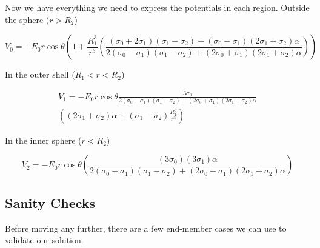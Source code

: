 Now we have everything we need to express the potentials in each region. Outside the sphere ($r > R_2$)
    \begin{mdframed}[backgroundcolor=gray!10, innertopmargin=0pt, innerbottommargin=10pt]
        \begin{equation}
    V_0
    = -E_0 r \cos\theta
    \left(1+
    \frac{R_1^{3}}{r^3}
    \left(
    \frac{
    (\sigma_0 + 2\sigma_1)(\sigma_1 - \sigma_2) + (\sigma_0 - \sigma_1)(2\sigma_1 + \sigma_2)\alpha
    }
    {
    2 (\sigma_0-\sigma_1)(\sigma_1 - \sigma_2) + (2\sigma_0 + \sigma_1)(2\sigma_1 + \sigma_2)\alpha
    }
    \right)\right)
    \label{eq:V0final}
    \end{equation}
    \end{mdframed}
In the outer shell ($R_1<r<R_2$)
\begin{mdframed}[backgroundcolor=gray!10, innertopmargin=0pt, innerbottommargin=10pt]
    \begin{equation}
    \begin{split}
    V_1
    =
    -E_0r\cos\theta\frac{3\sigma_0}{2 (\sigma_0-\sigma_1)(\sigma_1 - \sigma_2) + (2\sigma_0 + \sigma_1)(2\sigma_1 + \sigma_2)\alpha}
    \\ \left(
            (2\sigma_1 + \sigma_2)\alpha +
             (\sigma_1 - \sigma_2) \frac{R_1^3}{r^3}
    \right)
    \end{split}
    \label{eq:V1final}
    \end{equation}
\end{mdframed}
In the inner sphere ($r<R_2$)
\begin{mdframed}[backgroundcolor=gray!10, innertopmargin=0pt, innerbottommargin=10pt]
    \begin{equation}
        V_2
        =-E_0 r\cos\theta
         \left(
        \frac{
        (3 \sigma_0) (3\sigma_1)\alpha
        }
        {
        2 (\sigma_0-\sigma_1)(\sigma_1 - \sigma_2) + (2\sigma_0 + \sigma_1)(2\sigma_1 + \sigma_2)\alpha
        }
        \right)
        \label{eq:V2final}
    \end{equation}
\end{mdframed}


\subsection{Sanity Checks}
Before moving any further, there are a few end-member cases we can use to validate our solution.

